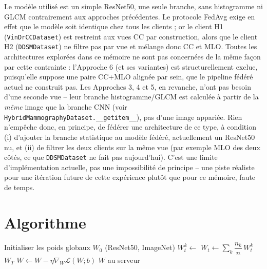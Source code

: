 \documentclass[12pt,a4paper]{report}
\begin{document}
Le modèle utilisé est un simple ResNet50, une seule branche, sans
histogramme ni GLCM contrairement aux approches précédentes. Le protocole
FedAvg exige en effet que le modèle soit identique chez tous les clients ;
or le client H1 (\texttt{VinDrCCDataset}) est restreint aux vues CC par
construction, alors que le client H2 (\texttt{DDSMDataset}) ne filtre pas
par vue et mélange donc CC et MLO. Toutes les architectures explorées dans
ce mémoire ne sont pas concernées de la même façon par cette contrainte :
l'Approche 6 (et ses variantes) est structurellement exclue, puisqu'elle
suppose une paire CC+MLO alignée par sein, que le pipeline fédéré actuel
ne construit pas. Les Approches 3, 4 et 5, en revanche, n'ont pas besoin
d'une seconde vue -- leur branche histogramme/GLCM est calculée à partir de
la \emph{même} image que la branche CNN (voir
\texttt{HybridMammographyDataset.\_\_getitem\_\_}), pas d'une image
appariée. Rien n'empêche donc, en principe, de fédérer une architecture de
ce type, à condition (i) d'ajouter la branche statistique au modèle
fédéré, actuellement un ResNet50 nu, et (ii) de filtrer les deux clients
sur la même vue (par exemple MLO des deux côtés, ce que \texttt{DDSMDataset}
ne fait pas aujourd'hui). C'est une limite d'implémentation actuelle, pas
une impossibilité de principe -- une piste réaliste pour une itération
future de cette expérience plutôt que pour ce mémoire, faute de temps.

\section{Algorithme}
\begin{algorithm}[h]
\caption{FedAvg -- apprentissage fédéré entre les clients H1 et H2}
\begin{algorithmic}[1]
  \State Initialiser les poids globaux $W_0$ (ResNet50, ImageNet)
      \State $W_t^k \gets$ 
    \EndFor
    \State $W_t \gets \sum_{k} \dfrac{n_k}{n}\, W_t^k$
  \EndFor
  \State \Return $W_T$
\EndProcedure
\Statex
{}
      \State $W \gets W - \eta \nabla_W \mathcal{L}(W; b)$
    \EndFor
  \EndFor
  \State \Return $W$ au serveur
\EndProcedure
\end{algorithmic}
\end{algorithm}
\end{document}
